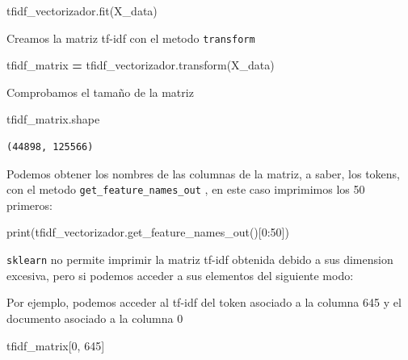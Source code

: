 \documentclass[
  11pt,
  a4paper,
]{article}
\newenvironment{Shaded}{\begin{snugshade}}{\end{snugshade}}
\newcommand{\BuiltInTok}[1]{#1}
\newcommand{\DecValTok}[1]{\textcolor[rgb]{0.00,0.00,0.81}{#1}}
\newcommand{\NormalTok}[1]{#1}
\newcommand{\OperatorTok}[1]{\textcolor[rgb]{0.81,0.36,0.00}{\textbf{#1}}}
\begin{document}
\begin{Shaded}
\begin{Highlighting}[]
\NormalTok{tfidf\_vectorizador.fit(X\_data)}
\end{Highlighting}
\end{Shaded}

Creamos la matriz tf-idf con el metodo \texttt{transform}

\begin{Shaded}
\begin{Highlighting}[]
\NormalTok{tfidf\_matrix }\OperatorTok{=}\NormalTok{ tfidf\_vectorizador.transform(X\_data)}
\end{Highlighting}
\end{Shaded}

Comprobamos el tamaño de la matriz

\begin{Shaded}
\begin{Highlighting}[]
\NormalTok{tfidf\_matrix.shape}
\end{Highlighting}
\end{Shaded}

\begin{verbatim}
(44898, 125566)
\end{verbatim}

Podemos obtener los nombres de las columnas de la matriz, a saber, los
tokens, con el metodo \texttt{get\_feature\_names\_out} , en este caso
imprimimos los 50 primeros:

\begin{Shaded}
\begin{Highlighting}[]
\BuiltInTok{print}\NormalTok{(tfidf\_vectorizador.get\_feature\_names\_out()[}\DecValTok{0}\NormalTok{:}\DecValTok{50}\NormalTok{])}
\end{Highlighting}
\end{Shaded}

\texttt{sklearn} no permite imprimir la matriz tf-idf obtenida debido a
sus dimension excesiva, pero si podemos acceder a sus elementos del
siguiente modo:

Por ejemplo, podemos acceder al tf-idf del token asociado a la columna
645 y el documento asociado a la columna 0

\begin{Shaded}
\begin{Highlighting}[]
\NormalTok{tfidf\_matrix[}\DecValTok{0}\NormalTok{, }\DecValTok{645}\NormalTok{]}
\end{Highlighting}
\end{Shaded}
\end{document}
